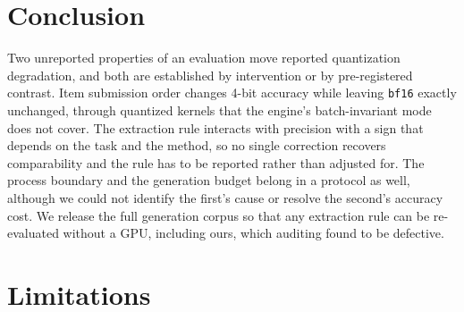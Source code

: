 \documentclass[conference]{IEEEtran}
\begin{document}
\section{Conclusion}
\label{sec:conclusion}

Two unreported properties of an evaluation move reported quantization degradation, and
both are established by intervention or by pre-registered contrast. Item submission order
changes 4-bit accuracy while leaving \texttt{bf16} exactly unchanged, through quantized
kernels that the engine's batch-invariant mode does not cover. The extraction rule
interacts with precision with a sign that depends on the task and the method, so no single
correction recovers comparability and the rule has to be reported rather than adjusted for.
The process boundary and the generation budget belong in a protocol as well, although we
could not identify the first's cause or resolve the second's accuracy cost. We release the
full generation corpus so that any extraction rule can be re-evaluated without a GPU,
including ours, which auditing found to be defective.

\label{end-of-body}

\section*{Limitations}
\label{sec:limitations}
\end{document}
